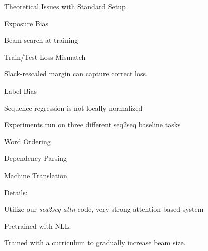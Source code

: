 \documentclass{beamer}
\let\tempone\itemize
\let\temptwo\enditemize
\renewenvironment{itemize}{\tempone\addtolength{\itemsep}{0.5\baselineskip}}{\temptwo}
\newcommand{\air}{\vspace{0.25cm}}
\newcommand{\Cite}[1]{{\footnotesize \citep{#1}}}
\begin{document}


\begin{frame}
  \centerline{Theoretical \alert{Issues} with Standard Setup}
  \begin{itemize}

  \item Exposure Bias
    \begin{itemize}
    \item Beam search at training
    \end{itemize}
    \air
  \item Train/Test Loss Mismatch 
    \begin{itemize}
    \item Slack-rescaled margin can capture correct loss.
    \end{itemize}

    \air
  \item Label Bias  \Cite{Lafferty2001}
    \begin{itemize}
    \item Sequence regression is not locally normalized
    \end{itemize}

  \end{itemize}
\end{frame}


\begin{frame}
  \centerline{}
  \air 

  Experiments run on three different seq2seq baseline tasks

  \begin{itemize}
  \item Word Ordering
    \air
  \item Dependency Parsing
    \air 
  \item Machine Translation
  \end{itemize}



  Details:
  \begin{itemize}
  \item Utilize our \textit{seq2seq-attn} code, very strong attention-based system 
  \item Pretrained with NLL. 
  \item Trained with a curriculum to gradually increase beam size.
  \end{itemize}
 
\end{frame}
\end{document}
